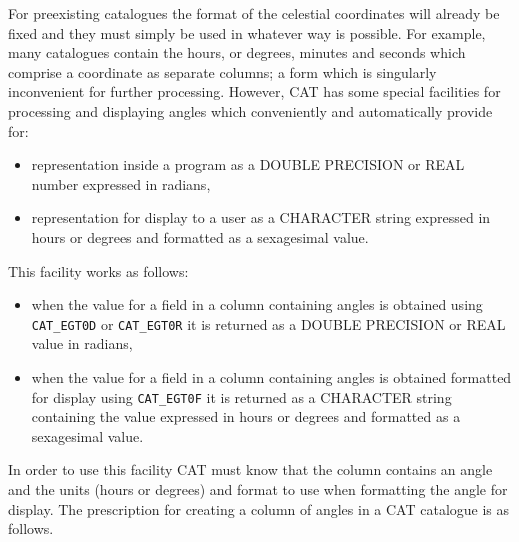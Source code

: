 \documentclass[11pt,twoside]{starlink}
\begin{document}
For preexisting catalogues the format of the celestial
coordinates will already be fixed and they must simply be used
in whatever way is possible. For example, many catalogues
contain the hours, or degrees, minutes and seconds which
comprise a coordinate as separate columns; a form which is
singularly inconvenient for further processing. However, CAT has
some special facilities for processing and displaying angles
which conveniently and automatically provide for:

\begin{itemize}

  \item representation inside a program as a DOUBLE PRECISION or
   REAL number expressed in radians,

  \item representation for display to a user as a CHARACTER
   string expressed in hours or degrees and formatted as a
   sexagesimal value.

\end{itemize}

This facility works as follows:

\begin{itemize}

  \item when the value for a field in a column containing angles
   is obtained using
  \newline \texttt{CAT\_EGT0D} or \texttt{CAT\_EGT0R} it is returned as a
   DOUBLE PRECISION or REAL value in radians,

  \item when the value for a field in a column containing angles
   is obtained formatted for display using \texttt{CAT\_EGT0F} it is
   returned as a CHARACTER string containing the value expressed in
   hours or degrees and formatted as a sexagesimal value.

\end{itemize}

In order to use this facility CAT must know that the column
contains an angle and the units (hours or degrees) and format to
use when formatting the angle for display. The prescription for
creating a column of angles in a CAT catalogue is as follows.
\end{document}
